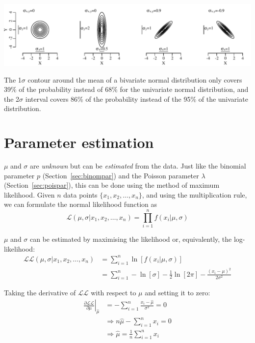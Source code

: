 \noindent\includegraphics[width=\textwidth]{../figures/cov.pdf}
\begingroup {}
\label{fig:cov}
\endgroup

The 1$\sigma$ contour around the mean of a bivariate normal
distribution only covers 39\% of the probability instead of $68\%$ for
the univariate normal distribution, and the 2$\sigma$ interval covers
86\% of the probability instead of the 95\% of the univariate
distribution.

\section{Parameter estimation}
\label{sec:normalparameters}

$\mu$ and $\sigma$ are \emph{unknown} but can be \emph{estimated} from
the data. Just like the binomial parameter $p$
(Section~\ref{sec:binompar}) and the Poisson parameter $\lambda$
(Section~\ref{sec:poispar}), this can be done using the method of
maximum likelihood.  Given $n$ data points $\{x_1, x_2, \ldots,
x_n\}$, and using the multiplication rule, we can formulate the normal
likelihood function as
\begin{equation}
  \mathcal{L}(\mu,\sigma|x_1,x_2,\ldots,x_n) =
  \prod\limits_{i=1}^{n}f(x_i|\mu,\sigma)
  \label{eq:Lnorm}
\end{equation}

$\mu$ and $\sigma$ can be estimated by maximising the likelihood or,
equivalently, the log-likelihood:
\begin{equation}
  \begin{split}
    \mathcal{LL}(\mu,\sigma|x_1,x_2,\ldots,x_n) & =
    \sum\limits_{i=1}^{n}\ln\left[f(x_i|\mu,\sigma)\right] \\ & =
    \sum\limits_{i=1}^{n} -\ln[\sigma] - \frac{1}{2}\ln[2\pi] -
    \frac{(x_i-\mu)^2}{2\sigma^2}
  \end{split}
  \label{eq:LLnorm}
\end{equation}

Taking the derivative of $\mathcal{LL}$ with respect to $\mu$ and
setting it to zero:
\begin{equation}
  \begin{split}
    \left.\frac{\partial{\mathcal{LL}}}{\partial{\mu}}\right|_{\hat{\mu}} & =
    - \sum\limits_{i=1}^{n} \frac{x_i-\hat{\mu}}{\sigma^2} = 0 \\
    & \Rightarrow n\hat{\mu} - \sum\limits_{i=1}^{n} x_i = 0 \\
    & \Rightarrow \hat{\mu} = \frac{1}{n}\sum\limits_{i=1}^{n}x_i
  \end{split}
\end{equation}

